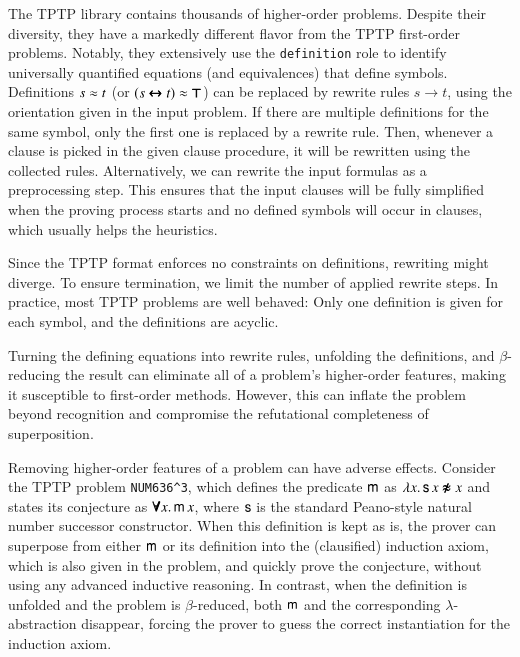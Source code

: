 The TPTP library contains thousands of higher-order problems. Despite their
diversity, they have a markedly different flavor from the TPTP first-order
problems. Notably, they extensively use the \verb|definition| role to identify
universally quantified equations (and equivalences) that define symbols.
%
Definitions $s \approx t$ (or $(s \pmb{\leftrightarrow} t) \approx \pmb{\top}$) can be replaced by rewrite
rules $s \longrightarrow t$,
using the orientation given in the input problem. If there are multiple
definitions for the same symbol, only the first one is replaced by a rewrite rule.
Then, whenever a clause is picked in the given clause procedure, it will be rewritten
using the collected rules.
Alternatively, we can rewrite
the input formulas as a preprocessing step. This ensures that the input
clauses will be fully simplified when the proving process starts and no
defined symbols will occur in clauses, which usually helps the heuristics.

Since the TPTP format enforces no constraints on
definitions, rewriting might diverge. To ensure
termination, we limit the number of applied rewrite steps. In
practice, most TPTP problems are well behaved: Only one
definition is given for each symbol, and the definitions are acyclic.

Turning the defining equations into rewrite rules, unfolding the definitions, and
$\beta$-reduc\-ing the result can eliminate all of a problem's higher-order features, making
it susceptible to first-order methods. However, this can inflate the problem
beyond recognition and compromise the refutational completeness of
superposition.

\begin{exa}
  \label{hot:exa:num636}
  Removing higher-order features of a problem can have adverse effects.
  Consider the TPTP problem \texttt{NUM636\^{}3}, which defines the predicate $\mathsf{m}$
  as $\lambda x.\, \mathsf{s} \, x \pmb{\not\approx} x$ and states its conjecture as $\pmb{\forall}
  x.\, \mathsf{m} \, x $, where $\mathsf{s}$ is the standard Peano-style natural number
  successor constructor. When this definition is kept as is, the
  prover can superpose from either $\mathsf{m}$ or its definition into the
  (clausified) induction axiom, which is also given in the problem, and quickly prove
  the conjecture, without using any advanced inductive reasoning. In contrast,
  when the definition is
  unfolded and the problem is $\beta$-reduced, both $\mathsf{m}$ and the
  corresponding $\lambda$-abstraction disappear, forcing the prover to guess the
  correct instantiation for the induction axiom.
\end{exa}

